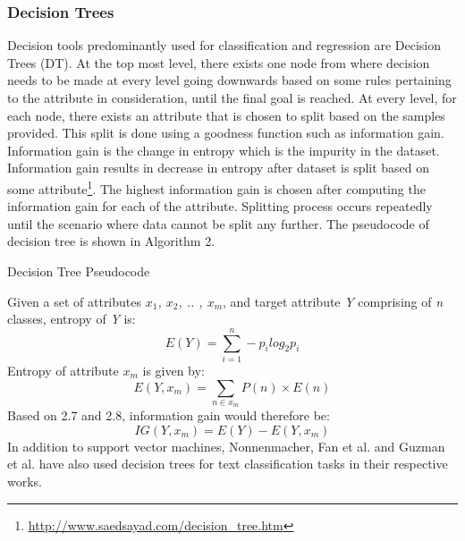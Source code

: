 \documentclass[a4paper,12pt,twoside]{report}
\begin{document}
\subsubsection{Decision Trees}
Decision tools predominantly used for classification and regression are Decision Trees (\acs{DT}). At the top most level, there exists one node from where decision needs to be made at every level going downwards based on some rules pertaining to the attribute in consideration, until the final goal is reached\cite{Jain2017}. 
\newline \newline
At every level, for each node, there exists an attribute that is chosen to split based on the samples provided. This split is done using a goodness function such as information gain. Information gain is the change in entropy which is the impurity in the dataset. Information gain results in decrease in entropy after dataset is split based on some attribute\footnote{\url{http://www.saedsayad.com/decision_tree.htm}}. The highest information gain is chosen after computing the information gain for each of the attribute. Splitting process occurs repeatedly until the scenario where data cannot be split any further\cite{Jain2017}. The pseudocode of decision tree is shown in Algorithm 2. 
\begin{algorithm}
\caption{Decision Tree Pseudocode}
\begin{algorithmic}[1]
\State {}
	\State {}
   	\State {}
\EndFor
\State {}
\State {}
\State {}
\EndProcedure
\end{algorithmic}
\end{algorithm}
\newline
Given a set of attributes \textit{$x_1$, $x_2$, .. , $x_m$}, and target attribute \textit{Y} comprising of \textit{n} classes, entropy of \textit{Y} is:
\begin{equation}
	E(Y) = \sum\limits_{i=1}^n -p_i log_2 p_i
\end{equation}
\newline
Entropy of attribute $x_m$ is given by:
\begin{equation}
E(Y, x_m) = \sum\limits_{n \in x_m} P(n) \times E(n)
\end{equation}
\newline
Based on 2.7 and 2.8, information gain would therefore be:
\begin{equation}
IG(Y, x_m) = E(Y) - E(Y, x_m)
\end{equation}
In addition to support vector machines, Nonnenmacher\cite{Nonnenmacher2017}, Fan et al.\cite{Fan2017} and Guzman et al.\cite{Guzman2016} have also used decision trees for text classification tasks in their respective works.
\end{document}
